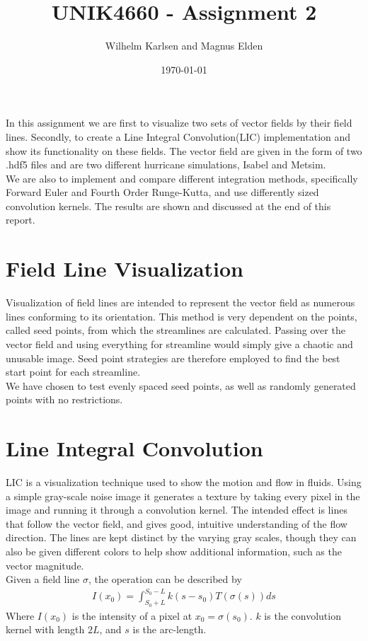 \documentclass[11pt,a4paper,english]{article}
\title{UNIK4660 - Assignment 2}
\author{Wilhelm Karlsen and Magnus Elden}
\date{\today}
\numberwithin{equation}{section}
\begin{document}
\maketitle
In this assignment we are first to visualize two sets of vector fields by their field lines. Secondly, to create a Line Integral Convolution(LIC) implementation and show its functionality on these fields. The vector field are given in the form of two .hdf5 files and are two different hurricane simulations, Isabel and Metsim.
\\
We are also to implement and compare different integration methods, specifically Forward Euler and Fourth Order Runge-Kutta, and use differently sized convolution kernels. The results are shown and discussed at the end of this report.

\section{Field Line Visualization}
Visualization of field lines are intended to represent the vector field as numerous lines conforming to its orientation. This method is very dependent on the points, called seed points, from which the streamlines are calculated. Passing over the vector field and using everything for streamline would simply give a chaotic and unusable image. Seed point strategies are therefore employed to find the best start point for each streamline. 
\\
We have chosen to test evenly spaced seed points, as well as randomly generated points with no restrictions.

\section{Line Integral Convolution}
LIC is a visualization technique used to show the motion and flow in fluids. Using a simple gray-scale noise image it generates a texture by taking every pixel in the image and running it through a convolution kernel. The intended effect is lines that follow the vector field, and gives good, intuitive understanding of the flow direction. The lines are kept distinct by the varying gray scales, though they can also be given different colors to help show additional information, such as the vector magnitude.
\\
Given a field line $\sigma$, the operation can be described by
\begin{align*}
	I(x_0) = \int_{S_0+L}^{S_0-L}k(s - s_0)T(\sigma(s))ds
\end{align*}
Where $I(x_0)$ is the intensity of a pixel at $x_0 = \sigma(s_0)$. $k$ is the convolution kernel with length $2L$, and $s$ is the arc-length.
\end{document}
